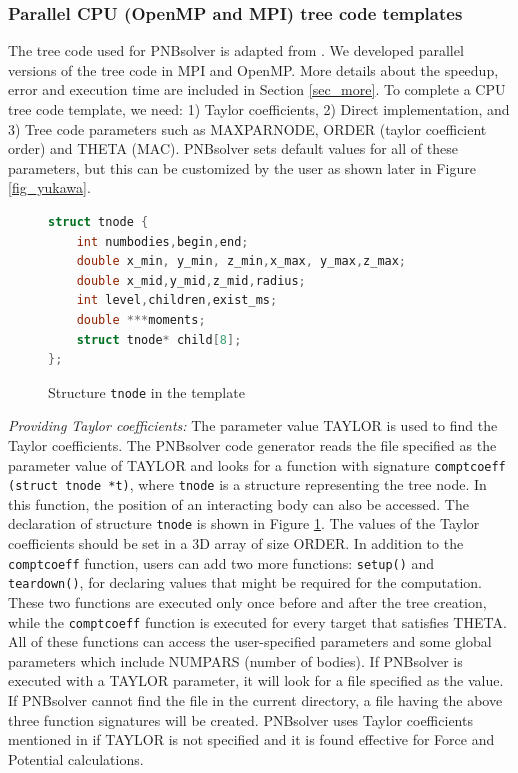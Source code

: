 \documentclass[draftclsnofoot]{elsarticle}
\begin{document}
\subsubsection{Parallel CPU (OpenMP and MPI) tree code templates}
The tree code used for PNBsolver is adapted from \cite{krasny1}. We developed parallel versions of the tree code in MPI and OpenMP. More details about the speedup, 
error and execution time are included in Section \ref{sec_more}. To complete a CPU tree code template, we need: 1) Taylor coefficients, 2) Direct 
implementation, and 3) Tree code parameters such as  MAXPARNODE, ORDER (taylor coefficient order) and THETA (MAC). PNBsolver sets default values for all of these 
parameters, but this can be customized by the user as shown later in Figure \ref{fig_yukawa}. 

\begin{figure}[!t]
\centering
\begin{lstlisting}[style=AMMA, language=C]
struct tnode {
    int numbodies,begin,end;
    double x_min, y_min, z_min,x_max, y_max,z_max;
    double x_mid,y_mid,z_mid,radius;
    int level,children,exist_ms;
    double ***moments;
    struct tnode* child[8];
};
\end{lstlisting}
\caption{Structure \texttt{tnode} in the template}
\label{fig_tnode}
\end{figure}

\textit{Providing Taylor coefficients: }
The parameter value TAYLOR is used to find the Taylor coefficients. The PNBsolver code generator reads the file specified as the parameter value of TAYLOR
and looks for a function with signature \texttt{comptcoeff (struct tnode *t)}, where \texttt{tnode} is a structure representing the tree node. In this function, the position of 
an interacting body can also be  accessed. The declaration of structure \texttt{tnode} is shown in Figure \ref{fig_tnode}. The values of the Taylor coefficients
should be set in a 3D array of size ORDER. In addition to the \texttt{comptcoeff} function, users can add two more functions: \texttt{setup()} and \texttt{teardown()}, for declaring 
values that might be required for the computation. These two functions are executed only once before and after the tree creation, while the \texttt{comptcoeff} function is executed
for every target that satisfies THETA. All of these functions  can access the user-specified parameters and some global parameters which include NUMPARS (number of bodies).
If PNBsolver is executed with a TAYLOR parameter, it will look for a file specified as the value. If PNBsolver cannot find the file in the current directory,
a file having the above three function signatures will be created. PNBsolver uses Taylor coefficients mentioned in  \cite{krasny1} 
if TAYLOR is not specified  and it is found effective for Force and Potential calculations. 
\end{document}
